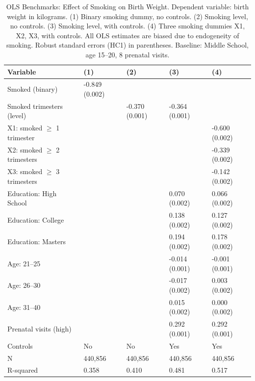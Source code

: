 \begin{table}[h!]
\centering
\caption{OLS Benchmarks: Effect of Smoking on Birth Weight. Dependent variable: birth weight in kilograms. (1) Binary smoking dummy, no controls. (2) Smoking level, no controls. (3) Smoking level, with controls. (4) Three smoking dummies X1, X2, X3, with controls. All OLS estimates are biased due to endogeneity of smoking. Robust standard errors (HC1) in parentheses. Baseline: Middle School, age 15--20, 8 prenatal visits.} 
\label{tab:ols}
\begingroup\small
\begin{tabular}{lllll}
  \toprule
Variable & (1) & (2) & (3) & (4) \\ 
  \midrule
Smoked (binary) & -0.849 (0.002) &  &  &  \\ 
  Smoked trimesters (level) &  & -0.370 (0.001) & -0.364 (0.001) &  \\ 
  X1: smoked $\geq$ 1 trimester &  &  &  & -0.600 (0.002) \\ 
  X2: smoked $\geq$ 2 trimesters &  &  &  & -0.339 (0.002) \\ 
  X3: smoked $\geq$ 3 trimesters &  &  &  & -0.142 (0.002) \\ 
  Education: High School &  &  & 0.070 (0.002) & 0.066 (0.002) \\ 
  Education: College &  &  & 0.138 (0.002) & 0.127 (0.002) \\ 
  Education: Masters &  &  & 0.194 (0.002) & 0.178 (0.002) \\ 
  Age: 21--25 &  &  & -0.014 (0.001) & -0.001 (0.001) \\ 
  Age: 26--30 &  &  & -0.017 (0.002) & 0.003 (0.002) \\ 
  Age: 31--40 &  &  & 0.015 (0.002) & 0.000 (0.002) \\ 
  Prenatal visits (high) &  &  & 0.292 (0.001) & 0.292 (0.001) \\ 
  Controls & No & No & Yes & Yes \\ 
  N & 440,856 & 440,856 & 440,856 & 440,856 \\ 
  R-squared & 0.358 & 0.410 & 0.481 & 0.517 \\ 
   \bottomrule
\end{tabular}
\endgroup
\end{table}
